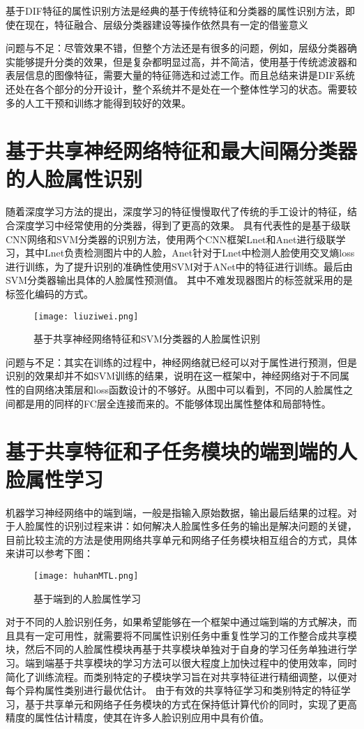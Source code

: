 基于DIF特征的属性识别方法是经典的基于传统特征和分类器的属性识别方法，即使在现在，特征融合、层级分类器建设等操作依然具有一定的借鉴意义

问题与不足：尽管效果不错，但整个方法还是有很多的问题，例如，层级分类器确实能够提升分类的效果，但是复杂都明显过高，并不简洁，使用基于传统滤波器和表层信息的图像特征，需要大量的特征筛选和过滤工作。而且总结来讲是DIF系统还处在各个部分的分开设计，整个系统并不是处在一个整体性学习的状态。需要较多的人工干预和训练才能得到较好的效果。
\section{基于共享神经网络特征和最大间隔分类器的人脸属性识别}
随着深度学习方法的提出，深度学习的特征慢慢取代了传统的手工设计的特征，结合深度学习中经常使用的分类器，得到了更高的效果。
具有代表性的是基于级联CNN网络和SVM分类器的识别方法\cite{CELEA}\cite{SVM}，使用两个CNN框架Lnet和Anet进行级联学习，其中Lnet负责检测图片中的人脸，Anet针对于Lnet中检测人脸使用交叉熵loss进行训练，为了提升识别的准确性使用SVM对于ANet中的特征进行训练。最后由SVM分类器输出具体的人脸属性预测值。
其中不难发现器图片的标签就采用的是标签化编码的方式。
\begin{figure}[!ht]
 \centering
	\texttt{[image: liuziwei.png]}
	\caption{基于共享神经网络特征和SVM分类器的人脸属性识别}
\end{figure}

问题与不足：其实在训练的过程中，神经网络就已经可以对于属性进行预测，但是识别的效果却并不如SVM训练的结果，说明在这一框架中，神经网络对于不同属性的自网络决策层和loss函数设计的不够好。从图中可以看到，不同的人脸属性之间都是用的同样的FC层全连接而来的。不能够体现出属性整体和局部特性。
\section{基于共享特征和子任务模块的端到端的人脸属性学习}
机器学习神经网络中的端到端，一般是指输入原始数据，输出最后结果的过程。对于人脸属性的识别过程来讲：如何解决人脸属性多任务的输出是解决问题的关键，目前比较主流的方法是使用网络共享单元和网络子任务模块相互组合的方式\cite{HUHAN_MTL}，具体来讲可以参考下图：
\begin{figure}[!ht]
 \centering
	\texttt{[image: huhanMTL.png]}
	\caption{基于端到的人脸属性学习}
\end{figure}
对于不同的人脸识别任务，如果希望能够在一个框架中通过端到端的方式解决，而且具有一定可用性，就需要将不同属性识别任务中重复性学习的工作整合成共享模块，然后不同的人脸属性模块再基于共享模块单独对于自身的学习任务单独进行学习。端到端基于共享模块的学习方法可以很大程度上加快过程中的使用效率，同时简化了训练流程。而类别特定的子模块学习旨在对共享特征进行精细调整，以便对每个异构属性类别进行最优估计。 由于有效的共享特征学习和类别特定的特征学习，基于共享单元和网络子任务模块的方式在保持低计算代价的同时，实现了更高精度的属性估计精度，使其在许多人脸识别应用中具有价值。

